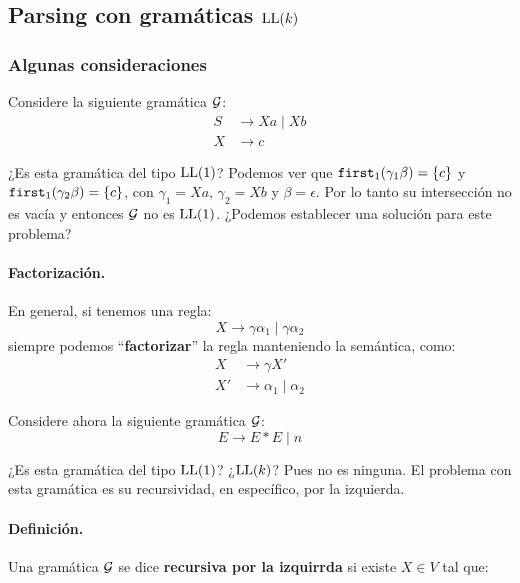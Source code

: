     \subsection[Parsing con gramáticas LL(k)]{Parsing con gramáticas $\text{LL}(k)$}
    \subsubsection{Algunas consideraciones}
    Considere la siguiente gramática $\mathcal{G}$:
    \begin{align*}
        S & \to Xa \mid Xb \\
        X & \to c
    \end{align*}

    ¿Es esta gramática del tipo $\text{LL}(1)$? Podemos ver que $\texttt{first}_1(\gamma_1 \beta) = \{c\}$ y $\texttt{first}_1(\gamma_2 \beta) = \{c\}$, con $\gamma_1 = Xa$, $\gamma_2 = Xb$ y $\beta = \epsilon$. Por lo tanto su intersección no es vacía y entonces $\mathcal{G}$ no es $\text{LL}(1)$. ¿Podemos establecer una solución para este problema?

\paragraph{Factorización.} En general, si tenemos una regla:
$$
    X \to \gamma\alpha_1 \mid \gamma \alpha_2
$$
siempre podemos ``\textbf{factorizar}'' la regla manteniendo la semántica, como:
\begin{align*}
    X  & \to \gamma X'              \\
    X' & \to \alpha_1 \mid \alpha_2
\end{align*}

Considere ahora la siguiente gramática $\mathcal{G}$:
$$
    E \to E * E \mid n
$$

¿Es esta gramática del tipo $\text{LL}(1)$? ¿$\text{LL}(k)$? Pues no es ninguna. El problema con esta gramática es su recursividad, en específico, por la izquierda.

\paragraph{Definición.} Una gramática $\mathcal{G}$ se dice \textbf{recursiva por la izquirrda} si existe $X \in V$ tal que:

